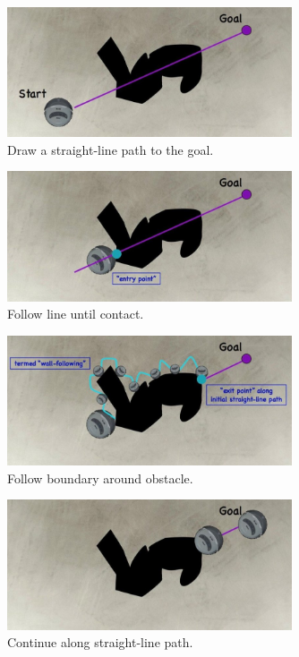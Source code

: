\begin{figure}[!h]
\centering
\includegraphics[width=0.75\textwidth]{figures/5_bug2.jpg}
\caption{Draw a straight-line path to the goal.}
\end{figure}

\begin{figure}[!h]
\centering
\includegraphics[width=0.75\textwidth]{figures/5_bug3.jpg}
\caption{Follow line until contact.}
\end{figure}

\begin{figure}[!h]
\centering
\includegraphics[width=0.75\textwidth]{figures/5_bug4.jpg}
\caption{Follow boundary around obstacle.}
\end{figure}

\begin{figure}[!h]
\centering
\includegraphics[width=0.75\textwidth]{figures/5_bug5.jpg}
\caption{Continue along straight-line path.}
\label{fig:5_bug5}
\end{figure}

